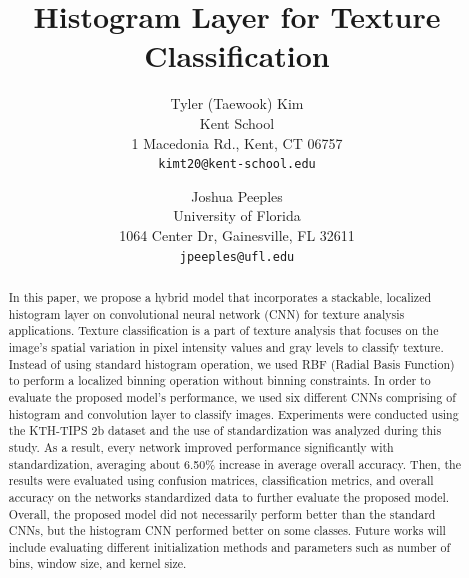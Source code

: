 \documentclass[10pt,twocolumn,letterpaper]{article}
\begin{document}

\title{Histogram Layer for Texture Classification}


\author{Tyler (Taewook) Kim\\
Kent School\\
1 Macedonia Rd., Kent, CT 06757\\
{\tt\small kimt20@kent-school.edu} 
\and
Joshua Peeples\\
University of Florida\\
1064 Center Dr, Gainesville, FL 32611\\
{\tt\small jpeeples@ufl.edu}
}

\maketitle


\begin{abstract}
	 In this paper, we propose a hybrid model that incorporates a stackable, localized histogram layer on convolutional neural network (CNN) for texture analysis applications. Texture classification is a part of texture analysis that focuses on the image’s spatial variation in pixel intensity values and gray levels to classify texture. Instead of using standard histogram operation, we used RBF (Radial Basis Function) to perform a localized binning operation without binning constraints. In order to evaluate the proposed model’s performance, we used six different CNNs comprising of histogram and convolution layer to classify images. Experiments were conducted using the KTH-TIPS 2b dataset and the use of standardization was analyzed during this study. As a result, every network improved performance significantly with standardization, averaging about 6.50\% increase in average overall accuracy. Then, the results were evaluated using confusion matrices, classification metrics, and overall accuracy on the networks standardized data to further evaluate the proposed model. Overall, the proposed model did not necessarily perform better than the standard CNNs, but the histogram CNN performed better on some classes. Future works will include evaluating different initialization methods and parameters such as number of bins, window size, and kernel size.
\end{abstract}
\end{document}
